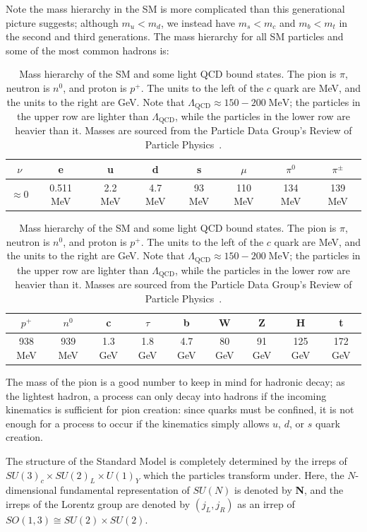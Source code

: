 \documentclass[11pt, oneside]{article}   	%
\theoremstyle{definition}
\numberwithin{equation}{subsection}		%
\begin{document}
Note the mass hierarchy in the SM is more complicated than this generational picture suggests; although $m_u < m_d$, 
we instead have $m_s < m_c$ and $m_b < m_t$ in the second and third generations. The mass hierarchy for all SM particles 
and some of the most common hadrons is:
\begin{table}[H]
	\centering
	\begin{tabular}{ | c | c | c | c | c | c | c | c | }
		\hline
		$\nu$ & e & u & d & s & $\mu$ & $\pi^0$ & $\pi^\pm$ \\
		\hline
		$\approx 0$ & 0.511 MeV & 2.2 MeV & 4.7 MeV & 93 MeV & 110 MeV & 134 MeV & 139 MeV \\
		\hline
		\end{tabular}
		\begin{tabular}{ | c | c | c | c | c | c | c | c | c | }
		\hline
		$p^+$ & $n^0$ & c & $\tau$ & b & W & Z & H & t \\
		\hline
		938 MeV & 939 MeV & 1.3 GeV & 1.8 GeV & 4.7 GeV & 80 GeV & 91 GeV & 125 GeV & 172 GeV \\
		\hline
	\end{tabular}
	\caption{Mass hierarchy of the SM and some light QCD bound states. The pion is $\pi$, neutron is $n^0$, 
	and proton is $p^+$. The units to the left of the $c$ quark are MeV, and the units to the right are GeV. Note that 
	$\Lambda_\mathrm{QCD}\approx 150 - 200\;\mathrm{MeV}$; the particles in the upper row are lighter than $\Lambda_\mathrm{QCD}$, 
	while the particles in the lower row are heavier than it. Masses are sourced from the Particle Data Group's Review of 
	Particle Physics~\cite{pdg}.}
\end{table}

The mass of the pion is a good number to keep in mind for hadronic decay; as the lightest hadron, a process can only decay into hadrons 
if the incoming kinematics is sufficient for pion creation: since quarks must be confined, it is not enough for a process to occur if 
the kinematics simply allows $u$, $d$, or $s$ quark creation.

The structure of the Standard Model is completely determined by the irreps of $SU(3)_c\times SU(2)_L\times 
U(1)_Y$ which the particles transform under. Here, the $N$-dimensional fundamental representation of $SU(N)$ is denoted by 
\textbf{N}, and the irreps of the Lorentz group are denoted by $(j_L, j_R)$ as an irrep of $SO(1, 3)\cong SU(2)\times SU(2)$. 
\end{document}
